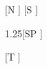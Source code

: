 \documentclass{article}
\begin{document}
[N \the\baselineskip] {\small[S \the\baselineskip]} {\begin{singlespace}\end{singlespace}}
{\begin{spacing}{1.25}[SP \the\baselineskip]\end{spacing}} {\linespread{2}}
\begin{table}{[T \the\baselineskip]}\end{table}
\end{document}
